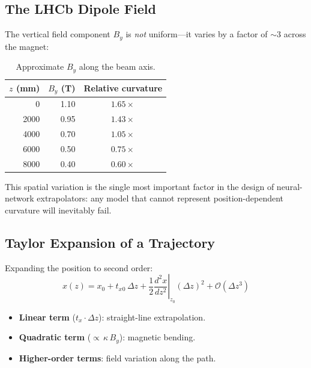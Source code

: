 \documentclass[11pt,a4paper]{article}
\newcommand{\dz}{\Delta z}
\newcommand{\tx}{t_x}
\begin{document}
\subsection{The LHCb Dipole Field}

The vertical field component $B_y$ is \emph{not} uniform---it varies by a
factor of ${\sim}3$ across the magnet:

\begin{table}[H]
\centering
\caption{Approximate $B_y$ along the beam axis.}
\label{tab:field}
\begin{tabular}{@{} r r c @{}}
\toprule
$z$ (mm) & $B_y$ (T) & Relative curvature \\
\midrule
0    & 1.10 & $1.65\times$ \\
2000 & 0.95 & $1.43\times$ \\
4000 & 0.70 & $1.05\times$ \\
6000 & 0.50 & $0.75\times$ \\
8000 & 0.40 & $0.60\times$ \\
\bottomrule
\end{tabular}
\end{table}

This spatial variation is the single most important factor in the design of
neural-network extrapolators: any model that cannot represent position-dependent
curvature will inevitably fail.

\subsection{Taylor Expansion of a Trajectory}\label{sec:taylor}

Expanding the position to second order:
\begin{equation}\label{eq:taylor}
  x(z) = x_0 + \tx{}_0\,\dz
       + \frac{1}{2}\left.\frac{d^2 x}{dz^2}\right|_{z_0}\!\!(\dz)^2
       + \mathcal{O}(\dz^3)
\end{equation}
\begin{itemize}[nosep]
  \item \textbf{Linear term} ($\tx\!\cdot\!\dz$): straight-line
        extrapolation.
  \item \textbf{Quadratic term} (${\propto}\,\kappa\,B_y$): magnetic
        bending.
  \item \textbf{Higher-order terms}: field variation along the path.
\end{itemize}
\end{document}
